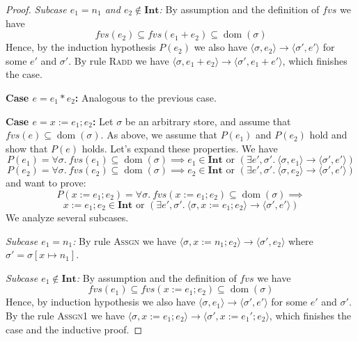 \documentclass[11pt]{article}
\begin{document}
\begin{proof}
\smallskip
\noindent\textit{Subcase $e_1 = n_1$ and $e_2 \notin \mathbf{Int}$:} By assumption and the
definition of $fvs$ we have
\[
fvs(e_2) \subseteq fvs(e_1 + e_2) \subseteq \operatorname{dom}(\sigma)
\]
Hence, by the induction hypothesis $P(e_2)$ we also have $\langle \sigma, e_2 \rangle \to
\langle \sigma', e' \rangle$ for some $e'$ and $\sigma'$. By rule \textsc{Radd} we have $\langle
\sigma, e_1 + e_2 \rangle \to \langle \sigma', e_1 + e' \rangle$, which finishes the case.

\medskip
\noindent\textbf{Case $e = e_1 * e_2$:} Analogous to the previous case.

\medskip
\noindent\textbf{Case $e = x := e_1 ; e_2$:} Let $\sigma$ be an arbitrary store, and assume that
$fvs(e) \subseteq \operatorname{dom}(\sigma)$. As above, we assume that $P(e_1)$ and $P(e_2)$
hold and show that $P(e)$ holds. Let's expand these properties. We have
\[
P(e_1) = \forall \sigma.\ fvs(e_1) \subseteq \operatorname{dom}(\sigma) \implies e_1 \in
\mathbf{Int} \text{ or } (\exists e', \sigma'.\ \langle \sigma, e_1 \rangle \to \langle \sigma',
e' \rangle)
\]
\[
P(e_2) = \forall \sigma.\ fvs(e_2) \subseteq \operatorname{dom}(\sigma) \implies e_2 \in
\mathbf{Int} \text{ or } (\exists e', \sigma'.\ \langle \sigma, e_2 \rangle \to \langle \sigma',
e' \rangle)
\]
and want to prove:
\[
P(x := e_1 ; e_2) = \forall \sigma.\ fvs(x := e_1 ; e_2) \subseteq \operatorname{dom}(\sigma)
\implies
\]
\[
x := e_1 ; e_2 \in \mathbf{Int} \text{ or } (\exists e', \sigma'.\ \langle \sigma, x := e_1 ;
e_2 \rangle \to \langle \sigma', e' \rangle)
\]
We analyze several subcases.

\smallskip
\noindent\textit{Subcase $e_1 = n_1$:} By rule \textsc{Assgn} we have $\langle \sigma, x := n_1
; e_2 \rangle \to \langle \sigma', e_2 \rangle$ where $\sigma' = \sigma[x \mapsto n_1]$.

\smallskip
\noindent\textit{Subcase $e_1 \notin \mathbf{Int}$:} By assumption and the definition of $fvs$
we have
\[
fvs(e_1) \subseteq fvs(x := e_1 ; e_2) \subseteq \operatorname{dom}(\sigma)
\]
Hence, by induction hypothesis we also have $\langle \sigma, e_1 \rangle \to \langle \sigma',
e' \rangle$ for some $e'$ and $\sigma'$. By the rule \textsc{Assgn1} we have $\langle \sigma, x
:= e_1 ; e_2 \rangle \to \langle \sigma', x := e_1' ; e_2 \rangle$, which finishes the case and
the inductive proof.
\end{proof}
\end{document}

